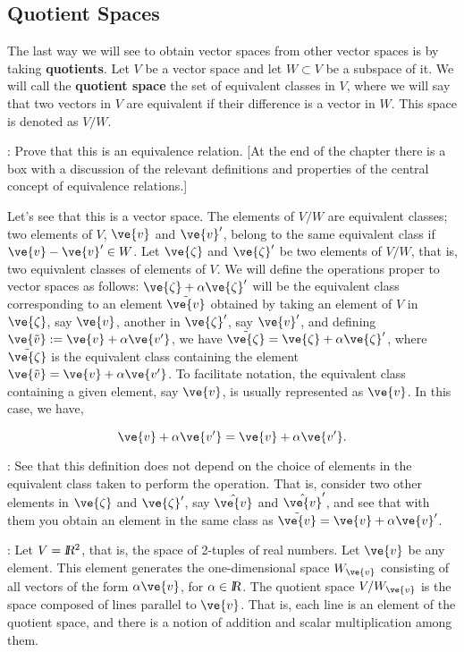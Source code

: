 \subsection{Quotient Spaces}

The last way we will see to obtain vector spaces from other vector spaces is by taking \textbf{quotients}. Let $V$ be a vector space and let $W \subset V$ be a subspace of it. We will call the \textbf{quotient space} the set of equivalent classes in $V$, where we will say that two vectors in $V$ are equivalent if their difference is a vector in $W$. This space is denoted as $V/W$.

\ejer: Prove that this is an equivalence relation. [At the end of the chapter there is a box with a discussion of the relevant definitions and properties of the central concept of equivalence relations.]

Let's see that this is a vector space. The elements of $V/W$ are equivalent classes; two elements of $V$, $\ve{v}$ and $\ve{v}'$, belong to the same equivalent class if $\ve{v}-\ve{v}' \in W$. Let $\ve{\zeta}$ and $\ve{\zeta}'$ be two elements of $V/W$, that is, two equivalent classes of elements of $V$. We will define the operations proper to vector spaces as follows: $\ve{\zeta} + \alpha \ve{\zeta}'$ will be the equivalent class corresponding to an element $\tilde{\ve{v}}$ obtained by taking an element of $V$ in $\ve{\zeta}$, say $\ve{v}$, another in $\ve{\zeta}'$, say $\ve{v}'$, and defining $\ve{\tilde{v}} := \ve{v} + \alpha \ve{v'}$, we have $\tilde{\ve{\zeta}}= \ve{\zeta} + \alpha \ve{\zeta}'$, where $\tilde{\ve{\zeta}}$ is the equivalent class containing the element $\ve{\tilde{v}} = \ve{v} + \alpha \ve{v'}$. To facilitate notation, the equivalent class containing a given element, say $\ve{v}$, is usually represented as ${\ve{v}}$. In this case, we have,

\[ 
{\ve{v}} + \alpha {\ve{v'}} = {\ve{v} + \alpha \ve{v'}}. 
\]

\ejer: See that this definition does not depend on the choice of elements in the equivalent class taken to perform the operation. That is, consider two other elements in $\ve{\zeta}$ and $\ve{\zeta}'$, say $\hat{\ve{v}}$ and $\hat{\ve{v}}'$, and see that with them you obtain an element in the same class as $\tilde{\ve{v}} = \ve{v} + \alpha \ve{v}'$.

\ejem: Let $V = \mbox{\sl {l$\!\!\!\;\:\!$R}}{}^2$, that is, the space of 2-tuples of real numbers. Let $\ve{v}$ be any element. This element generates the one-dimensional space $W_{\ve{v}}$ consisting of all vectors of the form $\alpha \ve{v}$, for $\alpha \in \mbox{\sl {l$\!\!\!\;\:\!$R}}$. The quotient space $V/W_{\ve{v}}$ is the space composed of lines parallel to $\ve{v}$. That is, each line is an element of the quotient space, and there is a notion of addition and scalar multiplication among them.

